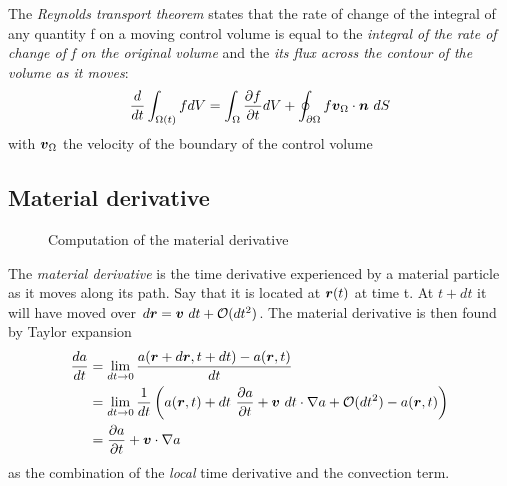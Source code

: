 

The \emph{Reynolds transport theorem} states that the rate of change
of the integral of any quantity f on a moving control volume is equal
to the \emph{integral of the rate of change of f on the original
  volume} and the \emph{its flux across the contour of the volume as
  it moves}:
\begin{align*}
  \begin{split}
    \frac{d}{dt} \int_{\Omega(t)} f dV = \int_{\Omega} \frac{\partial f}{\partial t} dV +
    \oint_{{\partial \Omega}} f \boldsymbol {v}_{\Omega} \cdot \boldsymbol {n}~dS
  \end{split}
\end{align*}
with $\boldsymbol {v}_{\Omega}$ the velocity of the boundary of the control volume

\subsection{Material derivative}

\begin{figure}[H]
  \caption{Computation of the material derivative}
\end{figure}

The \emph{material derivative} is the time derivative experienced by a
material particle as it moves along its path. Say that it is located
at $\boldsymbol {r}(t)$ at time t. At $t+dt$ it will have moved over $d\boldsymbol {r} =
\boldsymbol {v}~ dt + \mathcal O(dt^2)$. The material derivative is then found
by Taylor expansion
\begin{align*}
  \frac{d a}{dt} 
  &= \lim_{dt \rightarrow 0} \frac{a(\boldsymbol {r} + d\boldsymbol {r},t+dt) - a(\boldsymbol {r},t)}{dt} \\ 
  &= \lim_{dt \rightarrow 0} \frac{1}{dt} 
  \left(a(\boldsymbol {r},t) + dt~\frac{\partial a}{\partial t} + \boldsymbol {v}~dt \cdot \nabla a + \mathcal O(dt^2) - a(\boldsymbol {r},t)\right) \\
  &= \frac{\partial a}{\partial t} + \boldsymbol {v} \cdot \nabla a
\end{align*}
as the combination of the \emph{local} time derivative and the
convection term.

